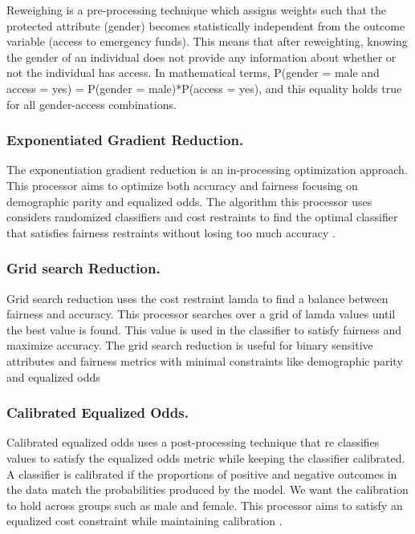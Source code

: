 \documentclass[water,article,submit,moreauthors,pdftex]{mdpi}
\begin{document}
Reweighing is a pre-processing technique which assigns weights such that
the protected attribute (gender) becomes statistically independent from
the outcome variable (access to emergency funds). This means that after
reweighting, knowing the gender of an individual does not provide any
information about whether or not the individual has access. In
mathematical terms, P(gender = male and access = yes) = P(gender =
male)*P(access = yes), and this equality holds true for all
gender-access combinations.

\hypertarget{exponentiated-gradient-reduction.}{%
\subsubsection{Exponentiated Gradient
Reduction.}\label{exponentiated-gradient-reduction.}}

The exponentiation gradient reduction is an in-processing optimization
approach. This processor aims to optimize both accuracy and fairness
focusing on demographic parity and equalized odds. The algorithm this
processor uses considers randomized classifiers and cost restraints to
find the optimal classifier that satisfies fairness restraints without
losing too much accuracy \citep{agarwal2018reductions}.

\hypertarget{grid-search-reduction.}{%
\subsubsection{Grid search Reduction.}\label{grid-search-reduction.}}

Grid search reduction uses the cost restraint lamda to find a balance
between fairness and accuracy. This processor searches over a grid of
lamda values until the best value is found. This value is used in the
classifier to satisfy fairness and maximize accuracy. The grid search
reduction is useful for binary sensitive attributes and fairness metrics
with minimal constraints like demographic parity and equalized odds
\citep{agarwal2018reductions, agarwal2019fair}

\hypertarget{calibrated-equalized-odds.}{%
\subsubsection{Calibrated Equalized
Odds.}\label{calibrated-equalized-odds.}}

Calibrated equalized odds uses a post-processing technique that re
classifies values to satisfy the equalized odds metric while keeping the
classifier calibrated. A classifier is calibrated if the proportions of
positive and negative outcomes in the data match the probabilities
produced by the model. We want the calibration to hold across groups
such as male and female. This processor aims to satisfy an equalized
cost constraint while maintaining calibration
\citep{pleiss2017fairness}.
\end{document}
